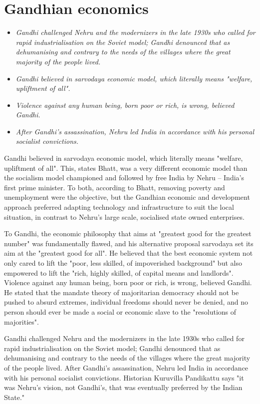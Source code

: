 \section{Gandhian economics}\label{gandhian-economics}

\begin{itemize}
\item
  \emph{Gandhi challenged Nehru and the modernizers in the late 1930s
  who called for rapid industrialisation on the Soviet model; Gandhi
  denounced that as dehumanising and contrary to the needs of the
  villages where the great majority of the people lived.}
\item
  \emph{Gandhi believed in sarvodaya economic model, which literally
  means "welfare, upliftment of all".}
\item
  \emph{Violence against any human being, born poor or rich, is wrong,
  believed Gandhi.}
\item
  \emph{After Gandhi's assassination, Nehru led India in accordance with
  his personal socialist convictions.}
\end{itemize}

Gandhi believed in sarvodaya economic model, which literally means
"welfare, upliftment of all". This, states Bhatt, was a very different
economic model than the socialism model championed and followed by free
India by Nehru -- India's first prime minister. To both, according to
Bhatt, removing poverty and unemployment were the objective, but the
Gandhian economic and development approach preferred adapting technology
and infrastructure to suit the local situation, in contrast to Nehru's
large scale, socialised state owned enterprises.

To Gandhi, the economic philosophy that aims at "greatest good for the
greatest number" was fundamentally flawed, and his alternative proposal
sarvodaya set its aim at the "greatest good for all". He believed that
the best economic system not only cared to lift the "poor, less skilled,
of impoverished background" but also empowered to lift the "rich, highly
skilled, of capital means and landlords". Violence against any human
being, born poor or rich, is wrong, believed Gandhi. He stated that the
mandate theory of majoritarian democracy should not be pushed to absurd
extremes, individual freedoms should never be denied, and no person
should ever be made a social or economic slave to the "resolutions of
majorities".

Gandhi challenged Nehru and the modernizers in the late 1930s who called
for rapid industrialisation on the Soviet model; Gandhi denounced that
as dehumanising and contrary to the needs of the villages where the
great majority of the people lived. After Gandhi's assassination, Nehru
led India in accordance with his personal socialist convictions.
Historian Kuruvilla Pandikattu says "it was Nehru's vision, not
Gandhi's, that was eventually preferred by the Indian State."

